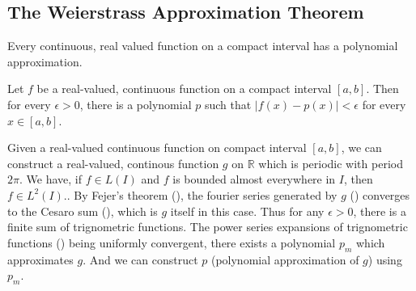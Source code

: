 \subsection{The Weierstrass Approximation Theorem}
\begin{important}
Every continuous, real valued function on a compact interval has a polynomial approximation.\cite[Theorem 11.17]{apostol}
\end{important}
\begin{theorem}[Weierstrass]
Let $f$ be a real-valued, continuous function on a compact interval $[a,b]$.
Then for every \(\epsilon > 0\), there is a polynomial $p$ such that \(|f(x)-p(x)| < \epsilon\) for every \(x \in [a,b]\).
\end{theorem}
\begin{synopsis}
Given a real-valued continuous function on compact interval $[a,b]$, we can construct a real-valued, continous function $g$ on $\mathbb{R}$ which is periodic with period $2\pi$.
We have, if \(f \in L(I)\) and $f$ is bounded almost everywhere in $I$, then \(f \in L^2(I)\).\cite[Theorem 10.52]{apostol}.
By Fejer's theorem (\cite[Theorem 11.15]{apostol}), the fourier series generated by $g$ (\cite[definition 11.3]{apostol}) converges to the Cesaro sum (\cite[Definition 8.47]{apostol}), which is $g$ itself in this case.
Thus for any \(\epsilon > 0\), there is a finite sum of trignometric functions.
The power series expansions of trignometric functions (\cite[definition 9.27]{apostol}) being uniformly convergent, there exists a polynomial $p_m$ which approximates $g$.
And we can construct $p$ (polynomial approximation of $g$) using $p_m$.
\end{synopsis}
